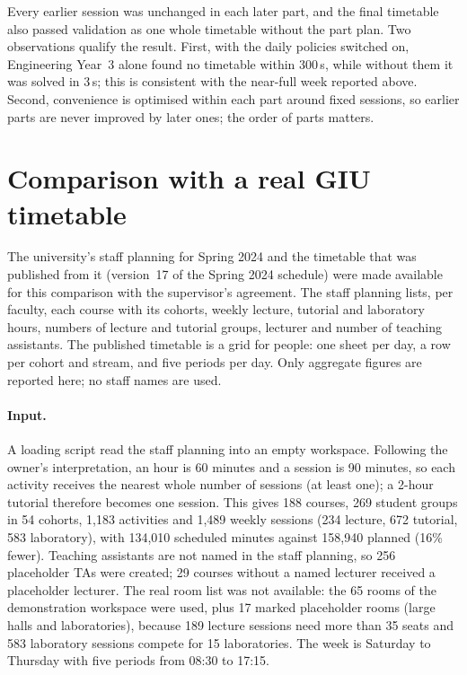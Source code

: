 Every earlier session was unchanged in each later part, and the final timetable also passed validation as one whole timetable without the part plan. Two observations qualify the result. First, with the daily policies switched on, Engineering Year~3 alone found no timetable within 300\,s, while without them it was solved in 3\,s; this is consistent with the near-full week reported above. Second, convenience is optimised within each part around fixed sessions, so earlier parts are never improved by later ones; the order of parts matters.

\section{Comparison with a real GIU timetable}\label{evidence-real}
The university's staff planning for Spring 2024 and the timetable that was published from it (version~17 of the Spring 2024 schedule) were made available for this comparison with the supervisor's agreement. The staff planning lists, per faculty, each course with its cohorts, weekly lecture, tutorial and laboratory hours, numbers of lecture and tutorial groups, lecturer and number of teaching assistants. The published timetable is a grid for people: one sheet per day, a row per cohort and stream, and five periods per day. Only aggregate figures are reported here; no staff names are used.

\paragraph{Input.} A loading script read the staff planning into an empty workspace. Following the owner's interpretation, an hour is 60 minutes and a session is 90 minutes, so each activity receives the nearest whole number of sessions (at least one); a 2-hour tutorial therefore becomes one session. This gives 188 courses, 269 student groups in 54 cohorts, 1{,}183 activities and 1{,}489 weekly sessions (234 lecture, 672 tutorial, 583 laboratory), with 134{,}010 scheduled minutes against 158{,}940 planned (16\% fewer). Teaching assistants are not named in the staff planning, so 256 placeholder TAs were created; 29 courses without a named lecturer received a placeholder lecturer. The real room list was not available: the 65 rooms of the demonstration workspace were used, plus 17 marked placeholder rooms (large halls and laboratories), because 189 lecture sessions need more than 35 seats and 583 laboratory sessions compete for 15 laboratories. The week is Saturday to Thursday with five periods from 08:30 to 17:15.


